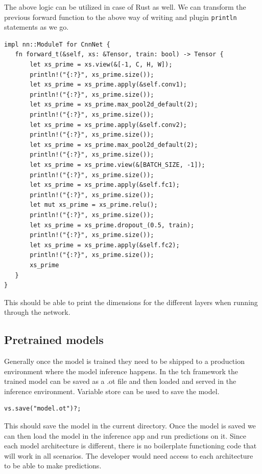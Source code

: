 \documentclass{book}
\begin{document}
The above logic can be utilized in case of Rust as well. We can transform the previous forward function to the above way of writing and plugin \lstinline{println} statements as we go.

\begin{lstlisting}[caption={}, basicstyle=\small]
impl nn::ModuleT for CnnNet {
   fn forward_t(&self, xs: &Tensor, train: bool) -> Tensor {
       let xs_prime = xs.view(&[-1, C, H, W]);
       println!("{:?}", xs_prime.size());
       let xs_prime = xs_prime.apply(&self.conv1);
       println!("{:?}", xs_prime.size());
       let xs_prime = xs_prime.max_pool2d_default(2);
       println!("{:?}", xs_prime.size());
       let xs_prime = xs_prime.apply(&self.conv2);
       println!("{:?}", xs_prime.size());
       let xs_prime = xs_prime.max_pool2d_default(2);
       println!("{:?}", xs_prime.size());
       let xs_prime = xs_prime.view(&[BATCH_SIZE, -1]);
       println!("{:?}", xs_prime.size());
       let xs_prime = xs_prime.apply(&self.fc1);
       println!("{:?}", xs_prime.size());
       let mut xs_prime = xs_prime.relu();
       println!("{:?}", xs_prime.size());
       let xs_prime = xs_prime.dropout_(0.5, train);
       println!("{:?}", xs_prime.size());
       let xs_prime = xs_prime.apply(&self.fc2);
       println!("{:?}", xs_prime.size());
       xs_prime
   }
}
\end{lstlisting}

This should be able to print the dimensions for the different layers when running through the network.

\label{sub:Model Building and Debugging}

\label{sub:CNN Model}

\subsection{Pretrained models}%
Generally once the model is trained they need to be shipped to a production environment where the model inference happens. In the tch framework the trained model can be saved as a .ot file and then loaded and served in the inference environment. Variable store can be used to save the model.

\begin{lstlisting}[caption={}, basicstyle=\small]
vs.save("model.ot")?;
\end{lstlisting}

This should save the model in the current directory. Once the model is saved we can then load the model in the inference app and run predictions on it. Since each model architecture is different, there is no boilerplate functioning code that will work in all scenarios. The developer would need access to each architecture to be able to make predictions.
\end{document}
